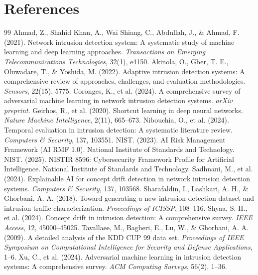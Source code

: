 \documentclass[10pt]{article}
\begin{document}
\section*{References}
\begin{thebibliography}{99}
 Ahmad, Z., Shahid Khan, A., Wai Shiang, C., Abdullah, J., \& Ahmad, F. (2021). Network intrusion detection system: A systematic study of machine learning and deep learning approaches. \textit{Transactions on Emerging Telecommunications Technologies}, 32(1), e4150.
 Akinola, O., Gber, T. E., Oluwadare, T., \& Yoshida, M. (2022). Adaptive intrusion detection systems: A comprehensive review of approaches, challenges, and evaluation methodologies. \textit{Sensors}, 22(15), 5775.
 Coronges, K., et al. (2024). A comprehensive survey of adversarial machine learning in network intrusion detection systems. \textit{arXiv preprint}.
 Geirhos, R., et al. (2020). Shortcut learning in deep neural networks. \textit{Nature Machine Intelligence}, 2(11), 665--673.
 Nibouchia, O., et al. (2024). Temporal evaluation in intrusion detection: A systematic literature review. \textit{Computers \& Security}, 137, 103551.
 NIST. (2023). AI Risk Management Framework (AI RMF 1.0). National Institute of Standards and Technology.
 NIST. (2025). NISTIR 8596: Cybersecurity Framework Profile for Artificial Intelligence. National Institute of Standards and Technology.
 Sadhnani, M., et al. (2024). Explainable AI for concept drift detection in network intrusion detection systems. \textit{Computers \& Security}, 137, 103568.
 Sharafaldin, I., Lashkari, A. H., \& Ghorbani, A. A. (2018). Toward generating a new intrusion detection dataset and intrusion traffic characterization. \textit{Proceedings of ICISSP}, 108--116.
 Shyaa, S. H., et al. (2024). Concept drift in intrusion detection: A comprehensive survey. \textit{IEEE Access}, 12, 45000--45025.
 Tavallaee, M., Bagheri, E., Lu, W., \& Ghorbani, A. A. (2009). A detailed analysis of the KDD CUP 99 data set. \textit{Proceedings of IEEE Symposium on Computational Intelligence for Security and Defense Applications}, 1--6.
 Xu, C., et al. (2024). Adversarial machine learning in intrusion detection systems: A comprehensive survey. \textit{ACM Computing Surveys}, 56(2), 1--36.
\end{thebibliography}
\end{document}
